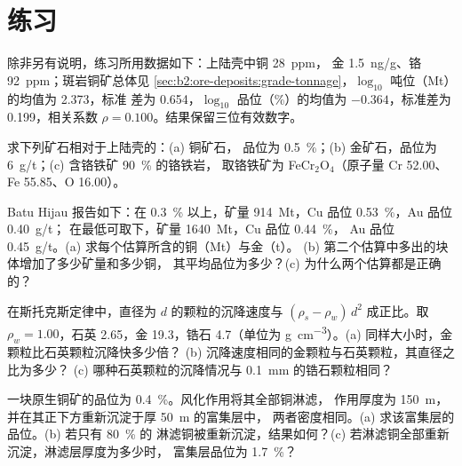 \section*{练习}\label{sec:b2:ore-deposits:exercises}

除非另有说明，练习所用数据如下：上陆壳中铜 \qty{28}{ppm}，
金 \qty{1.5}{ng/g}、铬 \qty{92}{ppm}；斑岩铜矿总体见
\cref{sec:b2:ore-deposits:grade-tonnage}，$\log_{10}$ 吨位（Mt）的均值为 2.373，标准
差为 0.654，$\log_{10}$ 品位（\%）的均值为 $-0.364$，标准差为 0.199，相关系数
$\rho = 0.100$。结果保留三位有效数字。

\begin{exercise}[$\star$]\label{exo:b2:ore-deposits:1}
求下列矿石相对于上陆壳的：(a) 铜矿石，
品位为 \qty{0.5}{\percent}；(b) 金矿石，品位为 \qty{6}{g/t}；(c) 含铬铁矿 \qty{90}{\percent} 的铬铁岩，
取铬铁矿为 FeCr$_2$O$_4$（原子量 Cr 52.00、Fe 55.85、O 16.00）。
\end{exercise}

\begin{exercise}[$\star$]\label{exo:b2:ore-deposits:2}
Batu Hijau 报告如下：在 \qty{0.3}{\percent} 以上，矿量 \qty{914}{Mt}，Cu 品位 \qty{0.53}{\percent}，Au 品位 \qty{0.40}{g/t}；
在最低可取下，矿量 \qty{1640}{Mt}，Cu 品位 \qty{0.44}{\percent}，
Au 品位 \qty{0.45}{g/t}。(a) 求每个估算所含的铜（Mt）与金（t）。
(b) 第二个估算中多出的块体增加了多少矿量和多少铜，
其平均品位为多少？(c) 为什么两个估算都是正确的？
\end{exercise}

\begin{exercise}[$\star$]\label{exo:b2:ore-deposits:3}
在斯托克斯定律中，直径为 $d$ 的颗粒的沉降速度与 $(\rho_s -
\rho_w)\,d^2$ 成正比。取 $\rho_w = 1.00$，石英 2.65，金 19.3，锆石 4.7（单位为
\unit{g.cm^{-3}}）。(a) 同样大小时，金颗粒比石英颗粒沉降快多少倍？
(b) 沉降速度相同的金颗粒与石英颗粒，其直径之比为多少？
(c) 哪种石英颗粒的沉降情况与 \qty{0.1}{mm} 的锆石颗粒相同？
\end{exercise}

\begin{exercise}[$\star$]\label{exo:b2:ore-deposits:4}
一块原生铜矿的品位为 \qty{0.4}{\percent}。风化作用将其全部铜淋滤，
作用厚度为 \qty{150}{m}，并在其正下方重新沉淀于厚 \qty{50}{m} 的富集层中，
两者密度相同。(a) 求该富集层的品位。(b) 若只有 \qty{80}{\percent} 的
淋滤铜被重新沉淀，结果如何？(c) 若淋滤铜全部重新沉淀，淋滤层厚度为多少时，
富集层品位为 \qty{1.7}{\percent}？
\end{exercise}

